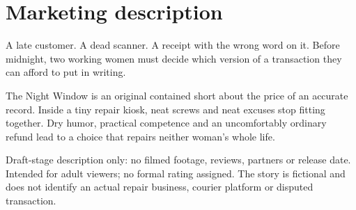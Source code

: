 \section{Marketing description}
A late customer. A dead scanner. A receipt with the wrong word on it. Before midnight, two working women must decide which version of a transaction they can afford to put in writing.

The Night Window is an original contained short about the price of an accurate record. Inside a tiny repair kiosk, neat screws and neat excuses stop fitting together. Dry humor, practical competence and an uncomfortably ordinary refund lead to a choice that repairs neither woman's whole life.

Draft-stage description only: no filmed footage, reviews, partners or release date. Intended for adult viewers; no formal rating assigned. The story is fictional and does not identify an actual repair business, courier platform or disputed transaction.
